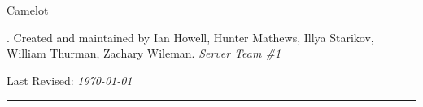 \begin{titlepage}

\noindent
\titlefont Camelot \\ \titlepagename \par
\epigraph{\titledescript. Created and maintained by Ian Howell, Hunter Mathews, Illya Starikov, William Thurman, Zachary Wileman. \textit{Server Team \#1}}%
{Last Revised: \textit{\today}\\\textsc{\lastEditAuthor}}
\null\vfill
\vspace*{1cm}
\noindent
\hfill
\begin{minipage}{0.35\linewidth}
    \begin{flushright}
        \printauthor
    \end{flushright}
\end{minipage}
%
\begin{minipage}{0.02\linewidth}
    \rule{1pt}{125pt}
\end{minipage}
\titlepagedecoration
\end{titlepage}
